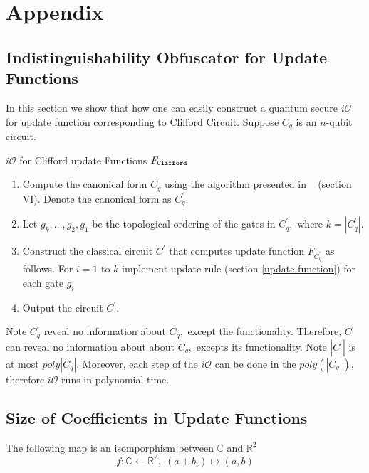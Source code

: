 \section{Appendix} 
\label{sec:appendix}
 \subsection{Indistinguishability Obfuscator for Update Functions}
 \label{sec: iO-clifford-functions}
 In this section we show that how one can easily construct a quantum secure $i\mathcal{O}$ for update function corresponding to Clifford Circuit. Suppose $C_q$ is an $n$-qubit circuit.
\begin{algorithm}[H]
  \caption{$i\mathcal{O}$ for Clifford update Functions $F_{\tt Clifford}$}
  \begin{enumerate}
  \item Compute the canonical form $C_q$ using the algorithm presented in ~\cite{AG04} (section VI). Denote the canonical form as $C_q^\prime.$
  \item Let $g_k, \ldots,g_2,g_1$ be the topological ordering of the gates in $C_q^\prime,$ where $k=|C_q^\prime|.$
  \item Construct the classical circuit $C^\prime$ that computes update function $F_{C_q^\prime}$ as follows. For $i=1$ to $k$ implement update rule (section \ref{update function})  for each gate $g_i$
  \item Output the circuit $C^\prime.$
  \end{enumerate}
\end{algorithm}
%
\noindent Note $C_q^\prime$ reveal no information about $C_q,$ except the functionality. Therefore, $C^\prime$ can reveal no information about about $C_q,$ excepts its functionality. Note $|C^\prime|$ is at most $poly|C_q|.$ Moreover, each step of the $i\mathcal{O}$ can be done in the $poly(|C_q|),$ therefore $i\mathcal{O}$ runs in polynomial-time.



 \subsection{Size of Coefficients in Update Functions}
 \label{coeff:size}
The following map is an isomporphism between $\mathbb{C}$ and $\mathbb{R}^2$
 \begin{equation}
  \label{size:map:real-complex)}
  f:\mathbb{C}\leftarrow \mathbb{R}^2, \; (a+b_i)\mapsto (a,b)
\end{equation}


